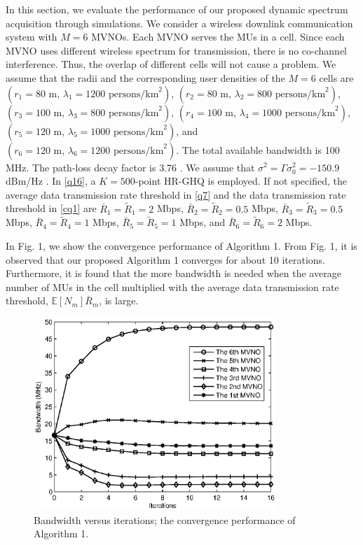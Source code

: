 \documentclass[journal]{IEEEtran}
\begin{document}
In this section, we evaluate the performance of our proposed dynamic spectrum acquisition through simulations. We consider a wireless downlink communication system with $M=6$ MVNOs. Each MVNO serves the MUs in a cell. Since each MVNO uses different wireless spectrum for transmission, there is no co-channel interference. Thus, the overlap of different cells will not cause a problem. We assume that the radii and the corresponding user densities of the $M=6$ cells are $(r_1 = 80\mbox{ m, }\lambda_1 = 1200\mbox{ persons/km}^2)$, $(r_2 = 80\mbox{ m, }\lambda_2 = 800\mbox{ persons/km}^2)$, $(r_3 = 100\mbox{ m, }\lambda_3 = 800\mbox{ persons/km}^2)$, $(r_4 = 100\mbox{ m, }\lambda_4 = 1000\mbox{ persons/km}^2)$, $(r_5 = 120\mbox{ m, }\lambda_5 = 1000\mbox{ persons/km}^2)$, and $(r_6 = 120\mbox{ m, }\lambda_6 = 1200\mbox{ persons/km}^2)$. The total available bandwidth is 100 MHz. The path-loss decay factor is 3.76 \cite{3GPP2}. We assume that $\sigma^2=\Gamma\sigma_0^2=-150.9$ dBm/Hz \cite{3GPP2}. In \eqref{q16}, a $K=500$-point HR-GHQ is employed. If not specified, the average data transmission rate threshold in \eqref{q7} and the data transmission rate threshold in \eqref{cq1} are $\bar{R}_1 =\tilde{R}_1=2$ Mbps, $\bar{R}_2 =\tilde{R}_2=0.5$ Mbps, $\bar{R}_3=\tilde{R}_3=0.5$ Mbps, $\bar{R}_4 =\tilde{R}_4=1$ Mbps, $\bar{R}_5=\tilde{R}_5=1$ Mbps, and $\bar{R}_6 =\tilde{R}_6=2$ Mbps.

In Fig. 1, we show the convergence performance of Algorithm 1. From Fig. 1, it is observed that our proposed Algorithm 1 converges for about 10 iterations. Furthermore, it is found that the more bandwidth
is needed when the average number of MUs in the cell multiplied with the average data transmission rate threshold, $\mathbb{E}[N_m]\bar{R}_m$, is large.

\begin{figure}
\centering
\includegraphics[width=3.6in]{fig1.eps}
\caption{Bandwidth versus iterations; the convergence performance of Algorithm 1.}
\end{figure}
\end{document}
